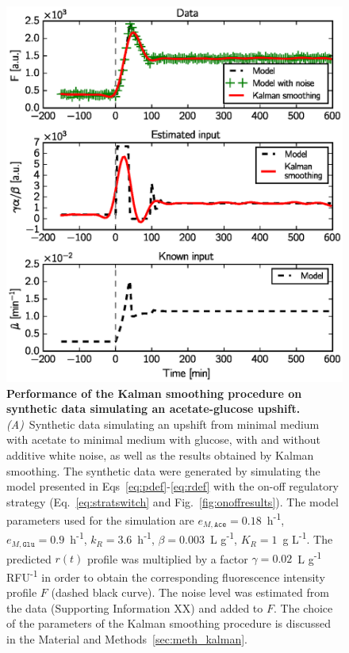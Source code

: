 \begin{figure}[p]
\centering
\includegraphics[scale=0.8]{./Fig/synthetic_upshift}
\caption{
\textbf{Performance of the Kalman smoothing procedure on synthetic data simulating an acetate-glucose upshift.}
\textit{(A)}~Synthetic data simulating an upshift from minimal medium with acetate to minimal medium with glucose, with and without additive white noise, as well as the results obtained by Kalman smoothing.
The synthetic data were generated by simulating the model presented in Eqs~\ref{eq:pdef}-\ref{eq:rdef} with the on-off regulatory strategy (Eq.~\ref{eq:stratswitch} and Fig.~\ref{fig:onoffresults}).
The model parameters used for the simulation are $e_{M,\texttt{Ace}} = 0.18$~h\textsuperscript{-1}, $e_{M,\texttt{Glu}} = 0.9$~h\textsuperscript{-1}, $k_R = 3.6$~h\textsuperscript{-1}, $\beta = 0.003$~L g\textsuperscript{-1}, $K_R = 1$~g L\textsuperscript{-1}.
The predicted $r(t)$ profile was multiplied by a factor $\gamma = 0.02$~L g\textsuperscript{-1} RFU\textsuperscript{-1} in order to obtain the corresponding fluorescence intensity profile $F$ (dashed black curve).
The noise level was estimated from the data (Supporting Information XX) and added to $F$.
The choice of the parameters of the Kalman smoothing procedure is discussed in the Material and Methods~\ref{sec:meth_kalman}.
}
\end{figure}
